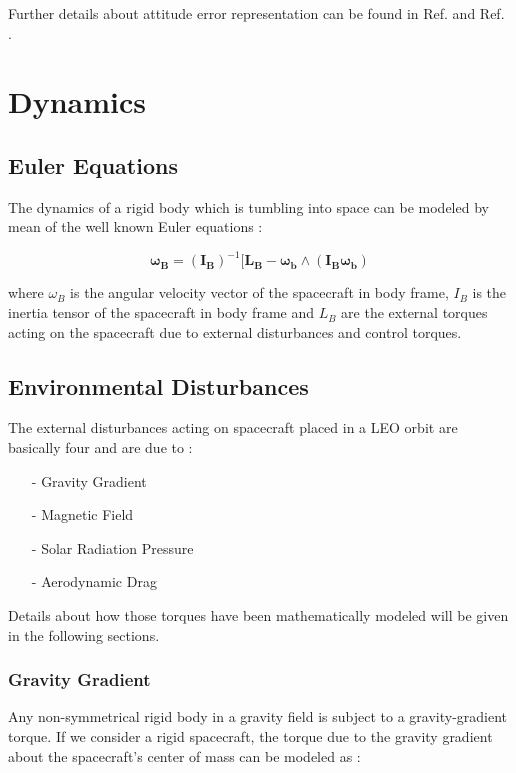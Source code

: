 \documentclass[11pt,a4paper]{report}
\begin{document}
Further details about attitude error representation can be found in Ref. \cite{notes:bigss} and Ref. \cite{Ref:Books:Fundamentals}.
\section{Dynamics}
\subsection{Euler Equations}
The dynamics of a rigid body which is tumbling into space can be modeled by mean of the well known Euler equations : 

\begin{equation}
  \mathbf{\omega_B} = \mathbf{(I_B)}^{-1} [\mathbf{L_B} - \mathbf{\omega_b}  \wedge (\mathbf{I_B} \mathbf{\omega_b})
\end{equation}

where \textbf{$\omega_B$} is the angular velocity vector of the spacecraft in body frame, \textbf{$I_B$} is the inertia tensor of the spacecraft in body frame and \textbf{$L_B$} are the external torques acting on the spacecraft due to  external disturbances and control torques.

\subsection{Environmental Disturbances} \label{sec:disturbances}
The external disturbances acting on spacecraft placed in a LEO orbit are basically four and are due to :

\begin{itemize}
  \item[-] Gravity Gradient
  \item[-] Magnetic Field 
  \item[-] Solar Radiation Pressure
  \item[-] Aerodynamic Drag
\end{itemize}

Details about how those torques have been mathematically modeled will be given in the following sections.

\subsubsection{Gravity Gradient}
Any non-symmetrical rigid body in a gravity field is subject to a gravity-gradient torque.
If we consider a rigid spacecraft, the torque due to the gravity gradient about the spacecraft's center of mass can be modeled as :
\end{document}
